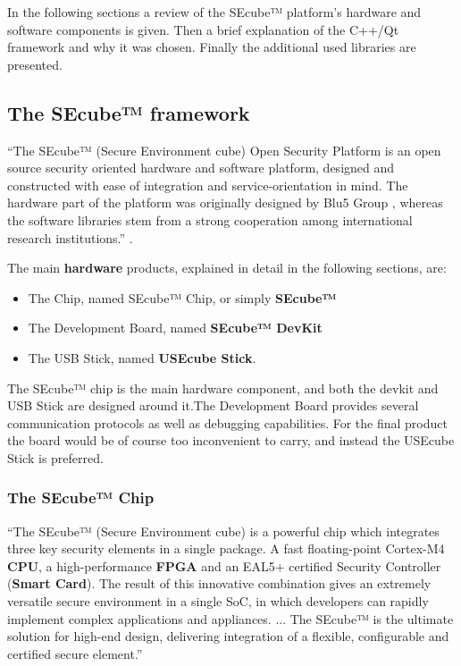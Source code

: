 In the following sections a review of the SEcube™ platform's hardware and software components is given. Then a brief explanation of the C++/Qt framework and why it was chosen. Finally the additional used libraries are presented.

\subsection{The SEcube™ framework}

``The SEcube™ (Secure Environment cube) Open Security Platform is an open source security oriented hardware and software platform, designed and constructed with ease of integration and service-orientation in mind. The hardware part of the platform was originally designed by Blu5 Group \cite{Blu5}, whereas the software libraries stem from a strong cooperation among international research institutions.'' \cite{GetStart}.

\vspace{5pt}

The main \textbf{hardware} products, explained in detail in the following sections, are:
\begin{itemize}
\setlength\itemsep{0pt}
\item The Chip, named SEcube™ Chip, or simply \textbf{SEcube™}
\item The Development Board, named \textbf{SEcube™ DevKit}
\item The USB Stick, named \textbf{USEcube Stick}.
\end{itemize}

The SEcube™ chip is the main hardware component, and both the devkit and USB Stick are designed around it.The Development Board provides several communication protocols as well as debugging capabilities. For the final product the board would be of course too inconvenient to carry, and instead the USEcube Stick is preferred.

\subsubsection{The SEcube™ Chip}

``The SEcube™ (Secure Environment cube) is a powerful chip which
integrates three key security elements in a single package. A fast
floating-point Cortex-M4 \textbf{CPU}, a high-performance \textbf{FPGA} and an
EAL5+ certified Security Controller (\textbf{Smart Card}).
The result of this innovative combination gives an extremely
versatile secure environment in a single SoC, in which developers
can rapidly implement complex applications and appliances.
... The SEcube™ is the ultimate solution for high-end design,
delivering integration of a flexible, configurable and certified
secure element.'' \cite{SEcubeDS}

